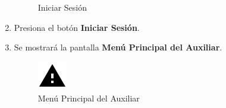 \begin{enumerate}
\begin{figure}[!htbp]
\begin{center}
			\caption{Iniciar Sesión}
			\label{fig:IniciarSesion2}
		\end{center}
	\end{figure}

	\item Presiona el botón \textbf{Iniciar Sesión}.
	
	\item Se mostrará la pantalla \textbf{Menú Principal del Auxiliar}.
	\newpage
		\begin{figure}[!htbp]			\hypertarget{fig:mpAuxiliar}{\hspace{1pt}}
		\begin{center}
			\includegraphics[height=0.4\textheight]{images/Iconos/Advertencia}
			\caption{Menú Principal del Auxiliar}
			\label{fig:mpAuxiliar}
		\end{center}
	\end{figure}


\end{enumerate}

